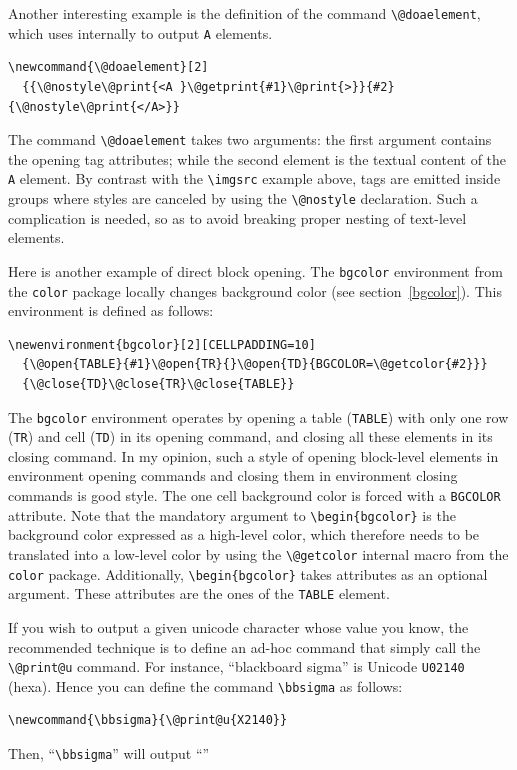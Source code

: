 Another interesting example is the definition of the command
\verb+\@doaelement+,
which \hevea{} uses internally to output \texttt{A} elements.
\begin{verbatim}
\newcommand{\@doaelement}[2]
  {{\@nostyle\@print{<A }\@getprint{#1}\@print{>}}{#2}{\@nostyle\@print{</A>}}
\end{verbatim}
The command \verb+\@doaelement+ takes two arguments: the first
argument contains the opening tag attributes; while the second element is
the textual content of the \verb+A+ element.
By contrast with the \verb+\imgsrc+ example above,
tags are emitted inside groups where styles are canceled by using the
\verb+\@nostyle+ declaration.
Such a complication is needed, so as to avoid breaking proper nesting
of text-level elements.

\label{getcolor:usage}
Here is another example of direct block opening.
The \texttt{bgcolor} environment from the \texttt{color} package
locally changes background color (see section~\ref{bgcolor}).
This environment is defined as follows:
\begin{verbatim}
\newenvironment{bgcolor}[2][CELLPADDING=10]
  {\@open{TABLE}{#1}\@open{TR}{}\@open{TD}{BGCOLOR=\@getcolor{#2}}}
  {\@close{TD}\@close{TR}\@close{TABLE}}
\end{verbatim}
The \texttt{bgcolor} environment operates by opening a \html{} table
(\verb+TABLE+) with only one row (\verb+TR+) and cell (\verb+TD+) in
its opening command, and closing all these elements in its closing
command. In my opinion, such a style of opening block-level elements
in environment opening commands and closing them in environment
closing commands is good style.
%
The one cell background color is forced with a \verb+BGCOLOR+
attribute.
Note that the mandatory argument to \verb+\begin{bgcolor}+ is the
background color expressed as a high-level color, which therefore
needs to be translated into a low-level color by using the
\verb+\@getcolor+ internal macro from the \texttt{color} package.
Additionally,  \verb+\begin{bgcolor}+ takes \html{} attributes
as an optional argument. These attributes are the ones of the
\verb+TABLE+ element.

%
If you wish to output a given unicode character whose value you know,
the recommended technique is to define an ad-hoc command
that simply call the \verb+\@print@u+ command.
For instance, ``blackboard sigma'' is Unicode \texttt{U02140} (hexa).
Hence you can define the command \verb+\bbsigma+ as follows:
\begin{verbatim}
\newcommand{\bbsigma}{\@print@u{X2140}}
\end{verbatim}
\ifhevea Then, ``\verb+\bbsigma+'' will output ``''\fi


